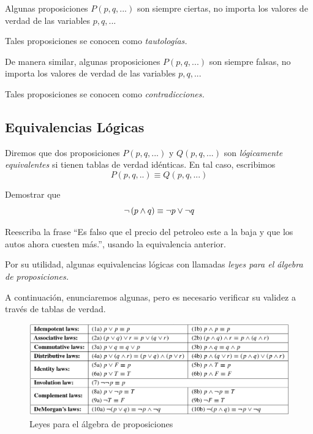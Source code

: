  Algunas proposiciones $P(p,q,...)$ son siempre ciertas, no importa los valores de verdad de las variables $p,q,...$ 
  
 
 Tales proposiciones se conocen como \emph{tautologías.}



 De manera similar, algunas proposiciones $P(p,q,...)$ son siempre falsas, no importa los valores de verdad de las variables $p,q,...$ 
  
 
 Tales proposiciones se conocen como \emph{contradicciones.}






\subsection{Equivalencias Lógicas}


 Diremos que dos proposiciones $P(p,q,...)$ y $Q(p,q,...)$ son \emph{lógicamente equivalentes} si tienen tablas de verdad idénticas. En tal caso, escribimos $$P(p,q,..)\equiv Q(p,q,...)$$



 \begin{problema} Demostrar que
  $$
  \neg\left( p \wedge q \right) \equiv \neg p \vee \neg q
  $$
 \end{problema}




 \begin{problema}
  Reescriba la frase ``Es falso que el precio del petroleo este a la baja y que los autos ahora cuesten más.'', usando la equivalencia anterior.
 \end{problema}





 Por su utilidad, algunas equivalencias lógicas con llamadas \emph{leyes para el álgebra de proposiciones.}
 
 
 A continuación, enunciaremos algunas, pero es necesario verificar su validez a través de tablas de verdad. 



\begin{figure}
	\centering
	\includegraphics[width=\linewidth]{md/tabla_4-1}
 \caption{Leyes para el álgebra de proposiciones}
\label{fig:tabla:4.1}
\end{figure}



